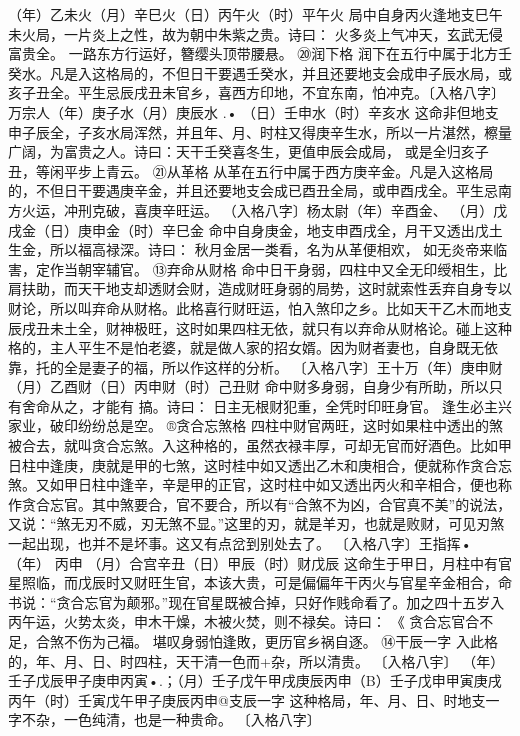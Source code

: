 （年）乙未火（月）辛巳火（日）丙午火（时）平午火
局中自身丙火逢地支巳午未火局，一片炎上之性，故为朝中朱紫之贵。诗曰：
火多炎上气冲天，玄武无侵富贵全。
一路东方行运好，簪缨头顶带腰悬。
⑳润下格
润下在五行中属于北方壬癸水。凡是入这格局的，不但日干要遇壬癸水，并且还要地支会成申子辰水局，或亥子丑全。平生忌辰戌丑未官乡，喜西方印地，不宜东南，怕冲克。〔入格八字〕万宗人（年）庚子水（月）庚辰水	.•
（日）壬申水（时）辛亥水
这命非但地支申子辰全，子亥水局浑然，并且年、月、时柱又得庚辛生水，所以一片湛然，檫量广阔，为富贵之人。诗曰：天干壬癸喜冬生，更值申辰会成局，
或是全归亥子丑，等闲平步上青云。
㉑从革格
从革在五行中属于西方庚辛金。凡是入这格局的，不但日干要遇庚辛金，并且还要地支会成已酉丑全局，或申酉戌全。平生忌南方火运，冲刑克破，喜庚辛旺运。
（入格八字〕杨太尉（年）辛酉金、
（月）戊戌金（日）庚申金（时）辛巳金
命中自身庚金，地支申酉戌全，月干又透出戊土生金，所以福高禄深。诗曰：
秋月金居一类看，名为从革便相欢，
如无炎帝来临害，定作当朝宰辅官。
⑬弃命从财格
命中日干身弱，四柱中又全无印绶相生，比肩扶助，而天干地支却透财会财，造成财旺身弱的局势，这时就索性丢弃自身专以财论，所以叫弃命从财格。此格喜行财旺运，怕入煞印之乡。比如天干乙木而地支辰戌丑未土全，财神极旺，这时如果四柱无依，就只有以弃命从财格论。碰上这种格的，主人平生不是怕老婆，就是做人家的招女婿。因为财者妻也，自身既无依靠，托的全是妻子的福，所以作这样的分析。
〔入格八字〕王十万（年）庚申财（月）乙酉财（日）丙申财（时）己丑财
命中财多身弱，自身少有所助，所以只有舍命从之，才能有
搞。诗曰：
日主无根财犯重，全凭时印旺身官。
逢生必主兴家业，破印纷纷总是空。
®贪合忘煞格
四柱中财官两旺，这时如果柱中透出的煞被合去，就叫贪合忘煞。入这种格的，虽然衣禄丰厚，可却无官而好酒色。比如甲日柱中逢庚，庚就是甲的七煞，这时桂中如又透出乙木和庚相合，便就称作贪合忘煞。又如甲日柱中逢辛，辛是甲的正官，这时柱中如又透出丙火和辛相合，便也称作贪合忘官。其中煞要合，官不要合，所以有“合煞不为凶，合官真不美”的说法，又说：“煞无刃不威，刃无煞不显。”这里的刃，就是羊刃，也就是败财，可见刃煞一起出现，也并不是坏事。这又有点岔到别处去了。
〔入格八字〕王指挥•（年）	丙申
（月）合宫辛丑（日）甲辰（时）财戊辰
这命生于甲日，月柱中有官星照临，而戊辰时又财旺生官，本该大贵，可是偏偏年干丙火与官星辛金相合，命书说：“贪合忘官为颠邪。”现在官星既被合掉，只好作贱命看了。加之四十五岁入丙午运，火势太炎，申木干燥，木被火焚，则不禄矣。诗曰：	《
贪合忘官合不足，合煞不伤为己福。
堪叹身弱怕逢敗，更历官乡祸自逐。
⑭干辰一字
入此格的，年、月、日、时四柱，天干清一色而+杂，所以清贵。
〔入格八宇〕
（年）壬子戊辰甲子庚申丙寅•.；（月）壬子戊午甲戌庚辰丙申（B）壬子戊申甲寅庚戌丙午（时）壬寅戊午甲子庚辰丙申@支辰一字
这种格局，年、月、日、时地支一字不杂，一色纯清，也是一种贵命。
〔入格八字〕		
